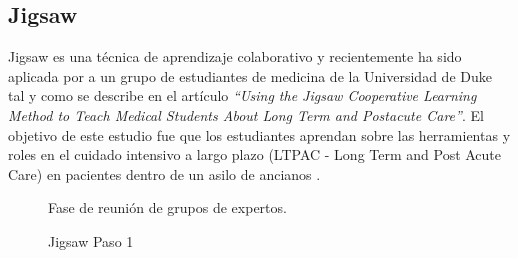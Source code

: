 \subsection{Jigsaw}
Jigsaw es una técnica de aprendizaje colaborativo y recientemente ha sido aplicada por  a un grupo de estudiantes de medicina  de la Universidad de Duke tal y como se describe en el artículo \emph{``Using the Jigsaw Cooperative Learning Method to Teach Medical Students About Long Term and Postacute Care''}. El objetivo de este estudio fue que los estudiantes aprendan sobre las herramientas y roles en el cuidado intensivo a largo plazo (LTPAC - Long Term and Post Acute Care) en pacientes dentro de un asilo de ancianos \cite{Buhr2014429}.


\begin{figure}[!h]
  \centering

  \caption{Jigsaw Paso 1}{Fase de reunión de grupos de expertos. }
    \\
  \label{fig:jigsaw_ltpac_1}
\end{figure}

